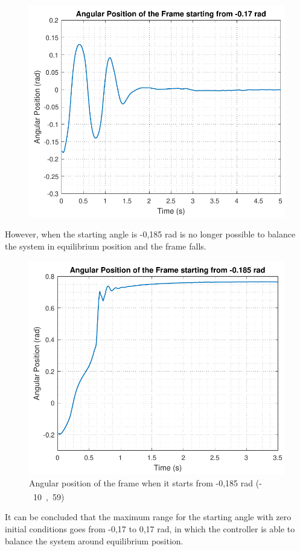 \begin{minipage}{\linewidth}
\begin{minipage}{0.45\linewidth}
\begin{figure}[H]
			\includegraphics[scale=.55]{figures/testCatch_17}
			\centering
			\captionsetup{justification=centering}
			\label{testCatch_17}
		\end{figure}
	\end{minipage}
\end{minipage}

However, when the starting angle is -0,185 rad is no longer possible to balance the system in equilibrium position and the frame falls.
%
\begin{figure}[H] 
	\centering
	\includegraphics[scale=0.55]{figures/testCatch_185}
	\caption{Angular position of the frame when it starts from -0,185 rad (\si{-10,59^\circ})}
	\label{testCatch_185}
\end{figure}
%
It can be concluded that the maximum range for the starting angle with zero initial conditions goes from -0,17 to 0,17 rad, in which the controller is able to balance the system around equilibrium position.